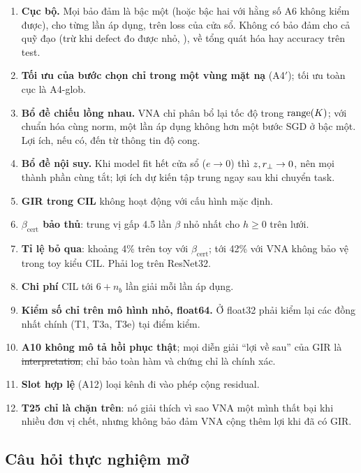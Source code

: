 \begin{enumerate}
\item \textbf{Cục bộ.} Mọi bảo đảm là bậc một (hoặc bậc hai với hằng số A6 không kiểm được), cho từng lần áp dụng, trên loss của cửa sổ. Không có bảo đảm cho cả quỹ đạo (trừ khi defect đo được nhỏ, ), về tổng quát hóa hay accuracy trên test.
\item \textbf{Tối ưu của bước chọn chỉ trong một vùng mặt nạ} (A4$'$); tối ưu toàn cục là A4-glob.
\item \textbf{Bổ đề chiếu lồng nhau.} VNA chỉ phân bổ lại tốc độ trong $\operatorname{range}(K)$; với chuẩn hóa cùng norm, một lần áp dụng không hơn một bước SGD ở bậc một. Lợi ích, nếu có, đến từ thông tin độ cong.
\item \textbf{Bổ đề nội suy.} Khi model fit hết cửa sổ ($e\to0$) thì $z,r_{\perp}\to0$, nên mọi thành phần cùng tắt; lợi ích dự kiến tập trung ngay sau khi chuyển task.
\item \textbf{GIR trong CIL} không hoạt động với cấu hình mặc định.
\item \textbf{$\beta_{\mathrm{cert}}$ bảo thủ}: trung vị gấp 4.5 lần $\beta$ nhỏ nhất cho $h\ge0$ trên lưới.
\item \textbf{Tỉ lệ bỏ qua}: khoảng 4\% trên toy với $\beta_{\mathrm{cert}}$; tới 42\% với VNA không bảo vệ trong toy kiểu CIL. Phải log trên ResNet32.
\item \textbf{Chi phí} CIL tới $6+n_b$ lần giải mỗi lần áp dụng.
\item \textbf{Kiểm số chỉ trên mô hình nhỏ, float64.} Ở float32 phải kiểm lại các đồng nhất chính (T1, T3a, T3e) tại điểm kiểm.
\item \textbf{A10 không mô tả hồi phục thật}; mọi diễn giải ``lợi về sau'' của GIR là \st{interpretation}; chỉ bảo toàn hàm và chứng chỉ là chính xác.
\item \textbf{Slot hợp lệ} (A12) loại kênh đi vào phép cộng residual.
\item \textbf{T25 chỉ là chặn trên}: nó giải thích vì sao VNA một mình thất bại khi nhiều đơn vị chết, nhưng không bảo đảm VNA cộng thêm lợi khi đã có GIR.
\end{enumerate}

\subsection{Câu hỏi thực nghiệm mở}\label{sec:open}

